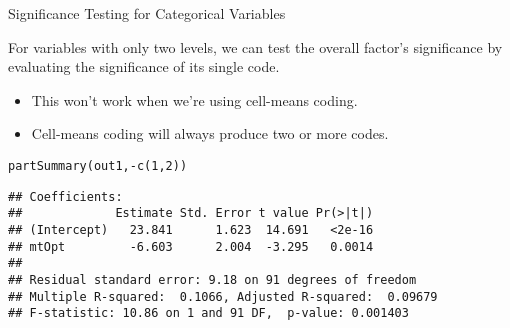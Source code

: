 \documentclass{beamer}\usepackage[]{graphicx}\usepackage[]{color}
\makeatletter
\newcommand{\hlnum}[1]{\textcolor[rgb]{0.69,0.494,0}{#1}}%
\newcommand{\hlopt}[1]{\textcolor[rgb]{0,0,0}{#1}}%
\newcommand{\hlstd}[1]{\textcolor[rgb]{0,0,0}{#1}}%
\newcommand{\hlkwd}[1]{\textcolor[rgb]{0.004,0.004,0.506}{#1}}%
\newenvironment{kframe}{%
 \def\at@end@of@kframe{}%
 \ifinner\ifhmode%
  \def\at@end@of@kframe{\end{minipage}}%
  \begin{minipage}{\columnwidth}%
 \fi\fi%
 \def\FrameCommand##1{\hskip\@totalleftmargin \hskip-\fboxsep
 \colorbox{shadecolor}{##1}\hskip-\fboxsep
     \hskip-\linewidth \hskip-\@totalleftmargin \hskip\columnwidth}%
 \MakeFramed {\advance\hsize-\width
   \@totalleftmargin\z@ \linewidth\hsize
   \@setminipage}}%
 {\par\unskip\endMakeFramed%
 \at@end@of@kframe}
\newenvironment{knitrout}{}{} %
\makeatother
\begin{document}
\watermarkoff %

\begin{frame}[fragile]{Significance Testing for Categorical Variables}
  
  For variables with only two levels, we can test the overall factor's 
  significance by evaluating the significance of its single code.
  \begin{itemize}
  \item This won't work when we're using cell-means coding.
  \item Cell-means coding will always produce two or more codes.
  \end{itemize}
 
\begin{knitrout}\footnotesize
{}\color{fgcolor}\begin{kframe}
\begin{alltt}
\hlkwd{partSummary}\hlstd{(out1,} \hlopt{-}\hlkwd{c}\hlstd{(}\hlnum{1}\hlstd{,} \hlnum{2}\hlstd{))}
\end{alltt}
\begin{verbatim}
## Coefficients:
##             Estimate Std. Error t value Pr(>|t|)
## (Intercept)   23.841      1.623  14.691   <2e-16
## mtOpt         -6.603      2.004  -3.295   0.0014
## 
## Residual standard error: 9.18 on 91 degrees of freedom
## Multiple R-squared:  0.1066,	Adjusted R-squared:  0.09679 
## F-statistic: 10.86 on 1 and 91 DF,  p-value: 0.001403
\end{verbatim}
\end{kframe}
\end{knitrout}
  
\end{frame}

\end{document}
